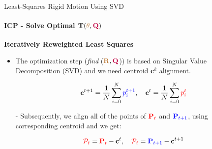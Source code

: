 \documentclass[aspectratio=169]{beamer}
\newcommand{\tikzRot}{0}
\newcommand{\tikzTrans}{(0,0)}
\newcommand{\tikzShowrobot}{0}
\newcommand{\tikzOneCenter}{0}
\begin{document}
\begin{frame}[fragile, c]{Least-Squares Rigid Motion Using SVD}
	\framesubtitle{ICP - Solve Optimal $\mathbf{T}(\textcolor{brown}{\theta}, \textcolor{purple}{\mathbf{Q}})$}
	\textbf{Iteratively Reweighted Least Squares}

	\begin{minipage}[t]{0.5\textwidth}
		\begin{figure}
			\resizebox{0.7\textwidth}{!}{
				\renewcommand{\tikzRot}{30}
				\renewcommand{\tikzTrans}{(8,0)}
				\renewcommand{\tikzShowrobot}{0}
				\renewcommand{\tikzOneCenter}{0}
				\resizebox{0.8\textwidth}{!}{
				}
			}
		\end{figure}
	\end{minipage}
	\begin{minipage}[t]{0.5\textwidth}

	\vspace{-0.2in}
	\begin{itemize}
		\item The optimization step (\textit{find} ($\textcolor{brown}{\mathbf{R}}, \textcolor{purple}{\mathbf{Q}}$)) is based on Singular Value Decomposition (SVD) and we need centroid $\mathbf{c}^k$ alignment.

	\vspace{-0.2in}
	\begin{equation*}
		\mathbf{c}^{t+1} = \frac{1}{N}\sum\limits_{i=0}^N \textcolor{blue}{p^{t+1}_i}, 
		\quad
		\mathbf{c}^{t} = \frac{1}{N}\sum\limits_{i=0}^N \textcolor{red}{p^{t}_i}
	\end{equation*}

	\item[-] Subsequently, we align all of the points of $\textcolor{red}{\mathbf{P}_{t}}$ and $\textcolor{blue}{\mathbf{P}_{t+1}}$, using corresponding centroid and we get:

	\vspace{-0.2in}
	\begin{equation*}
		\textcolor{red}{\mathcal{P}_{t}} = \textcolor{red}{\mathbf{P}_{t}} - \mathbf{c}^{t}, \quad \textcolor{red}{\mathcal{P}_{t}} = \textcolor{blue}{\mathbf{P}_{t+1}} - \mathbf{c}^{t+1}
	\end{equation*}

	\end{itemize}
	\end{minipage}
\end{frame}
\end{document}
